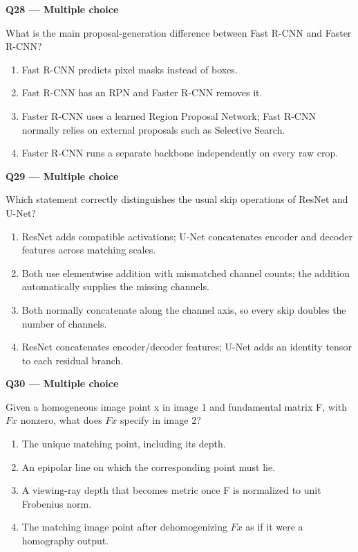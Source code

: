 \documentclass[11pt,a4paper]{article}
\begin{document}
\par\vspace{12pt}
\begin{minipage}{\linewidth}
\textbf{Q28 — Multiple choice}\par\smallskip
What is the main proposal-generation difference between Fast R-CNN and Faster R-CNN?
\begin{enumerate}[label=\textbf{\Alph*.}]
\item Fast R-CNN predicts pixel masks instead of boxes.
\item Fast R-CNN has an RPN and Faster R-CNN removes it.
\item Faster R-CNN uses a learned Region Proposal Network; Fast R-CNN normally relies on external proposals such as Selective Search.
\item Faster R-CNN runs a separate backbone independently on every raw crop.
\end{enumerate}
\end{minipage}
\par\vspace{12pt}
\begin{minipage}{\linewidth}
\textbf{Q29 — Multiple choice}\par\smallskip
Which statement correctly distinguishes the usual skip operations of ResNet and U-Net?
\begin{enumerate}[label=\textbf{\Alph*.}]
\item ResNet adds compatible activations; U-Net concatenates encoder and decoder features across matching scales.
\item Both use elementwise addition with mismatched channel counts; the addition automatically supplies the missing channels.
\item Both normally concatenate along the channel axis,\allowbreak{} so every skip doubles the number of channels.
\item ResNet concatenates encoder/\allowbreak{}decoder features; U-Net adds an identity tensor to each residual branch.
\end{enumerate}
\end{minipage}
\par\vspace{12pt}
\begin{minipage}{\linewidth}
\textbf{Q30 — Multiple choice}\par\smallskip
Given a homogeneous image point x in image 1 and fundamental matrix F,\allowbreak{} with \(Fx\) nonzero,\allowbreak{} what does \(Fx\) specify in image 2?
\begin{enumerate}[label=\textbf{\Alph*.}]
\item The unique matching point,\allowbreak{} including its depth.
\item An epipolar line on which the corresponding point must lie.
\item A viewing-ray depth that becomes metric once F is normalized to unit Frobenius norm.
\item The matching image point after dehomogenizing \(Fx\) as if it were a homography output.
\end{enumerate}
\end{minipage}
\end{document}
